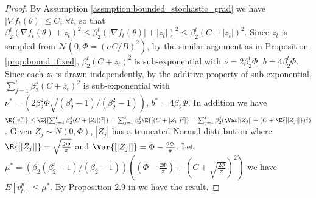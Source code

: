 \documentclass[letterpaper]{article} %
\def\cN{\mathcal{N}}
\begin{document}
\begin{proof}
    By Assumption \ref{assmption:bounded_stochastic_grad} we have $|\nabla f_t(\theta)| \leq C, \, \forall t$, so that $\beta_2^t(\nabla f_t(\theta) + z_t)^2 \leq \beta_2^t(|\nabla f_t(\theta)| + |z_t|)^2 \leq \beta_2^t(C + |z_t|)^2$.
    Since $z_t$ is sampled from $\cN(0, \Phi=(\sigma C/B)^2)$, by the similar argument as in Proposition \ref{prop:bound_fixed}, $\beta_2^t(C + z_t)^2$ is sub-exponential with $\nu = 2\beta_2^t\Phi$, $b=4\beta_2^t\Phi$. Since each $z_t$ is drawn independently, by the additive property of sub-exponential, $\sum_{j=1}^{t}\beta_2^{j}(C + z_t)^2$ is sub-exponential with $\nu^{*} = (2\beta_2^2\Phi\sqrt{(\beta_2^t-1)/ (\beta_2^2-1)})$, $b^{*}=4\beta_2\Phi$.
    In addition we have $\E{[v_t^p]} \leq \E{[\sum_{j=1}^{t}\beta_2^j(C+|Z_t|)^2]}=\sum_{j=1}^{t}\beta_2^j\E{[(C+|Z_t|)^2]} = \sum_{j=1}^{t}\beta_2^j (\Var[|Z_j|]+(C+\E{[|Z_j|]})^2)$. Given $Z_j\sim N(0,\Phi)$, $|Z_j|$ has a truncated Normal distribution where $\E{[|Z_j|]} = \sqrt{\frac{2\Phi}{\pi}}$ and $\Var{[|Z_j|]}=\Phi-\frac{2\Phi}{\pi}$. Let $\mu^{*} = (\beta_2(\beta_2^t-1)/(\beta_2-1))((\Phi-\frac{2\Phi}{\pi})+(C+\sqrt{\frac{2\Phi}{\pi}})^2)$ we have $E{[v_t^p]}\leq \mu^{*}$.
    By Proposition 2.9 in \citet{wainwright2019high} we have the result.
\end{proof}
\end{document}
